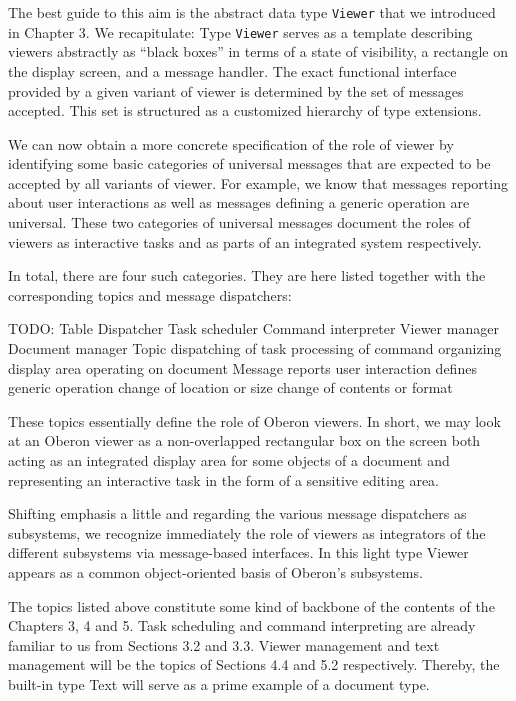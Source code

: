 The best guide to this aim is the abstract data type {\tt Viewer\/} that we
introduced in Chapter 3. We recapitulate: Type {\tt Viewer\/} serves as a
template describing viewers abstractly as ``black boxes'' in terms of a
state of visibility, a rectangle on the display screen, and a message
handler. The exact functional interface provided by a given variant of
viewer is determined by the set of messages accepted. This set is
structured as a customized hierarchy of type extensions.

We can now obtain a more concrete specification of the role of viewer
by identifying some basic categories of universal messages that are
expected to be accepted by all variants of viewer. For example, we
know that messages reporting about user interactions as well as
messages defining a generic operation are universal. These two
categories of universal messages document the roles of viewers as
interactive tasks and as parts of an integrated system respectively.

In total, there are four such categories. They are here listed
together with the corresponding topics and message dispatchers:

TODO: Table
Dispatcher
Task scheduler Command interpreter Viewer manager Document manager
Topic
dispatching of task processing of command organizing display area operating on document
Message
reports user interaction defines generic operation change of location or size change of contents or format

These topics essentially define the role of Oberon viewers. In short,
we may look at an Oberon viewer as a non-overlapped rectangular box on
the screen both acting as an integrated display area for some objects
of a document and representing an interactive task in the form of a
sensitive editing area.

Shifting emphasis a little and regarding the various message
dispatchers as subsystems, we recognize immediately the role of
viewers as integrators of the different subsystems via message-based
interfaces. In this light type Viewer appears as a common
object-oriented basis of Oberon's subsystems.

The topics listed above constitute some kind of backbone of the
contents of the Chapters 3, 4 and 5. Task scheduling and command
interpreting are already familiar to us from Sections 3.2 and
3.3. Viewer management and text management will be the topics of
Sections 4.4 and 5.2 respectively. Thereby, the built-in type Text
will serve as a prime example of a document type.

